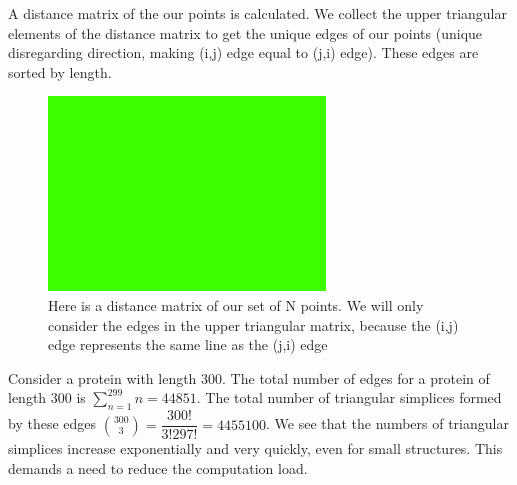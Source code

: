 \documentclass[12pt, a4paper, twocolumn, fullpage]{article}
\theoremstyle{plain}
\theoremstyle{definition}
\theoremstyle{remark}
\begin{document}
A distance matrix of the our points is calculated. We collect the upper triangular elements of the distance matrix to get the unique edges of our points (unique disregarding direction, making (i,j) edge equal to (j,i) edge). These edges are sorted by length.

\begin{figure}[t]
    \includegraphics[width=\linewidth]{img/blank.png}
    \caption{Here is a distance matrix of our set of N points. We will only consider the edges in the upper triangular matrix, because the (i,j) edge represents the same line as the (j,i) edge}
    \label{Distance matrix of example}
\end{figure}

Consider a protein with length 300. The total number of edges for a protein of length 300 is $\sum_{n=1}^{299} n =44851$. The total number of triangular simplices formed by these edges $\binom{300}{3}=\dfrac{300!}{3!297!}=4455100$.  We see that the numbers of triangular simplices increase exponentially and very quickly, even for small structures. This demands a need to reduce the computation load.
\end{document}

